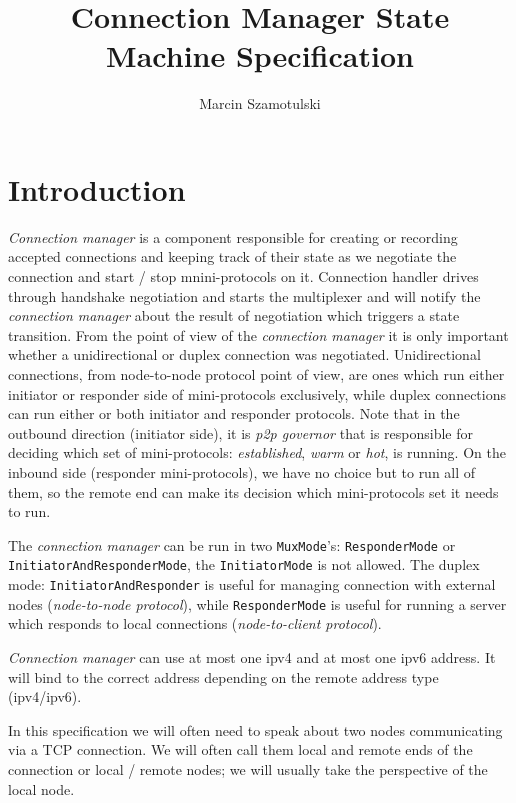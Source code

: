 \documentclass{article}
\title{Connection Manager State Machine Specification}
\author{Marcin Szamotulski}
\def\TCP{\textsf{TCP}}
\def\ipvfour{\textsf{ipv4}}
\def\ipvsix{\textsf{ipv6}}
\def\warm{\textit{warm}}
\def\hot{\textit{hot}}
\def\established{\textit{established}}
\def\ptopgov{\textit{p2p governor}}
\def\connmngr{\textit{connection manager}}
\def\Connmngr{\textit{Connection manager}}
\begin{document}
\maketitle

\section{Introduction}
\Connmngr{} is a component responsible for creating or recording
accepted connections and keeping track of their state as we negotiate the
connection and start / stop mnini-protocols on it.  Connection handler drives
through handshake negotiation and starts the multiplexer and will notify the
\connmngr{} about the result of negotiation which triggers a state
transition.  From the point of view of the \connmngr{} it is only
important whether a unidirectional or duplex connection was negotiated.
Unidirectional connections, from node-to-node protocol point of view, are ones
which run either initiator or responder side of mini-protocols exclusively,
while duplex connections can run either or both initiator and responder
protocols.  Note that in the outbound direction (initiator side), it is
\ptopgov{} that is responsible for deciding which set of mini-protocols:
\established{}, \warm{} or \hot{}, is running.  On the inbound side (responder
mini-protocols), we have no choice but to run all of them, so the remote end
can make its decision which mini-protocols set it needs to run.

The \connmngr{} can be run in two \texttt{MuxMode}'s:
\texttt{ResponderMode} or \texttt{InitiatorAndResponderMode}, the
\texttt{InitiatorMode} is not allowed.  The duplex mode:
\texttt{InitiatorAndResponder} is useful for managing connection with external
nodes (\textit{node-to-node protocol}), while \texttt{ResponderMode} is useful
for running a server which responds to local connections
(\textit{node-to-client protocol}).

\Connmngr{} can use at most one \ipvfour{} and at most one \ipvsix{}
address.  It will bind to the correct address depending on the remote address
type (\ipvfour{}/\ipvsix{}).

In this specification we will often need to speak about two nodes communicating
via a \TCP{} connection.  We will often call them local and remote ends of the
connection or local \slash{} remote nodes; we will usually take the
perspective of the local node.
\end{document}
